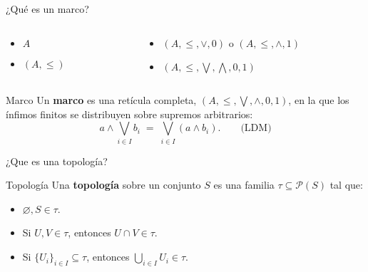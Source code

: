 \documentclass[compress,12pt]{beamer}
\begin{document}
\begin{frame}{¿Qué es un marco?}
  \begin{columns}[T,totalwidth=\textwidth]
    \begin{column}{0.45\textwidth}
      \begin{itemize}
        \item<1-> $A$
        \item<2-> $(A, \leq)$
      \end{itemize}
    \end{column}

    \begin{column}{0.55\textwidth}
      \begin{itemize}
        \item<3-> $(A, \leq, \vee, 0)$ o $(A, \leq, \wedge, 1)$
        \item<4-> $(A, \leq, \bigvee, \bigwedge, 0, 1)$
      \end{itemize}
    \end{column}
  \end{columns}

  \vspace{1em}

  \begin{block}{Marco}
    Un \textbf{marco} es una retícula completa, $(A, \leq, \bigvee, \wedge, 0, 1)$,
    en la que los ínfimos finitos se distribuyen sobre supremos arbitrarios:
    \[
      a \wedge \bigvee_{i \in I} b_i \;=\; \bigvee_{i \in I} (a \wedge b_i).\qquad \mbox{(LDM)}
    \]
  \end{block}
\end{frame}

\begin{frame}{¿Que es una topología?}
 \begin{block}{Topología}
    Una \textbf{topología} sobre un conjunto $S$ es una familia $\tau \subseteq \mathcal{P}(S)$ tal que:
    \begin{itemize}
      \item $\varnothing, S \in \tau$.
      \item Si $U,V \in \tau$, entonces $U \cap V \in \tau$.
      \item Si $\{U_i\}_{i \in I} \subseteq \tau$, entonces $\bigcup_{i \in I} U_i \in \tau$.
    \end{itemize}
  \end{block}
    

\end{frame} 
\end{document}
